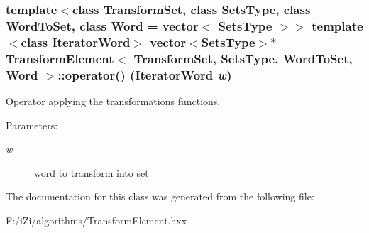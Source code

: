 \subsubsection{\setlength{\rightskip}{0pt plus 5cm}template$<$class Transform\-Set, class Sets\-Type, class Word\-To\-Set, class Word = vector$<$ Sets\-Type $>$$>$ template$<$class Iterator\-Word$>$ vector$<$Sets\-Type$>$$\ast$ {\bf Transform\-Element}$<$ Transform\-Set, Sets\-Type, Word\-To\-Set, Word $>$::operator() (Iterator\-Word {\em w})\hspace{0.3cm}{\tt  [inline]}}\label{class_transform_element_cfa1c9f1f11a8400bf8654b4bc03eb06}


Operator applying the transformations functions. 

\begin{Desc}
\item[Parameters:]
\begin{description}
\item[{\em w}]word to transform into set \end{description}
\end{Desc}


The documentation for this class was generated from the following file:\begin{CompactItemize}
\item 
F:/i\-Zi/algorithms/Transform\-Element.hxx\end{CompactItemize}
